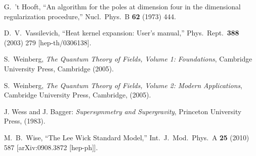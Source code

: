 \begin{thebibliography}{99}
  G.~'t Hooft,
  ``An algorithm for the poles at dimension four in the dimensional regularization procedure,''
  Nucl.\ Phys.\ B {\bf 62} (1973) 444.




  D.~V.~Vassilevich,
  ``Heat kernel expansion: User's manual,''
  Phys.\ Rept.\  {\bf 388} (2003) 279
  [hep-th/0306138].



   S.~Weinberg, {\em 
The Quantum Theory of Fields, Volume 1: Foundations}, Cambridge University Press, Cambridge (2005).  

   S.~Weinberg, {\em 
The Quantum Theory of Fields, Volume 2: Modern Applications}, Cambridge University Press, Cambridge, (2005).  







	J. Wess and J. Bagger: \emph{Supersymmetry and Supergravity},
	Princeton University Press, (1983).




  M.~B.~Wise,
  ``The Lee Wick Standard Model,''
  Int.\ J.\ Mod.\ Phys.\ A {\bf 25} (2010) 587
  [arXiv:0908.3872 [hep-ph]].


  
  
\end{thebibliography}


